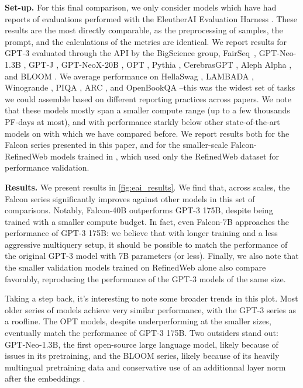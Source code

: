 \documentclass{article}
\begin{document}
\textbf{Set-up.} For this final comparison, we only consider models which have had reports of evaluations performed with the EleutherAI Evaluation Harness \citep{eval-harness}. These results are the most directly comparable, as the preprocessing of samples, the prompt, and the calculations of the metrics are identical. We report results for GPT-3 evaluated through the API by the BigScience group, FairSeq~\citep{artetxe2021efficient}, GPT-Neo-1.3B \citep{gpt-neo}, GPT-J \citep{gpt-j}, GPT-NeoX-20B \citep{black2022gpt}, OPT \citep{zhang2022opt}, Pythia \citep{biderman2023pythia}, CerebrasGPT \citep{dey2023cerebras}, Aleph Alpha \citep{alephalpha}, and BLOOM \citep{bloom}. We average performance on HellaSwag \citep{zellers2019hellaswag}, LAMBADA \citep{paperno2016lambada}, Winogrande \citep{sakaguchi2019winogrande}, PIQA \citep{bisk2020piqa}, ARC \citep{clark2018arc}, and OpenBookQA \citep{mihaylov2press2021train018openbookqa}--this was the widest set of tasks we could assemble based on different reporting practices across papers. We note that these models mostly span a smaller compute range (up to a few thousands PF-days at most), and with performance starkly below other state-of-the-art models on with which we have compared before. We report results both for the Falcon series presented in this paper, and for the smaller-scale Falcon-RefinedWeb models trained in \citet{refinedweb}, which used only the RefinedWeb dataset for performance validation.

\textbf{Results.} We present results in \cref{fig:eai_results}. We find that, across scales, the Falcon series significantly improves against other models in this set of comparisons. Notably, Falcon-40B outperforms GPT-3 175B, despite being trained with a smaller compute budget. In fact, even Falcon-7B approaches the performance of GPT-3 175B: we believe that with longer training and a less aggressive multiquery setup, it should be possible to match the performance of the original GPT-3 model with 7B parameters (or less). Finally, we also note that the smaller validation models trained on RefinedWeb alone also compare favorably, reproducing the performance of the GPT-3 models of the same size. 

Taking a step back, it's interesting to note some broader trends in this plot. Most older series of models achieve very similar performance, with the GPT-3 series as a roofline. The OPT models, despite underperforming at the smaller sizes, eventually match the performance of GPT-3 175B. Two outsiders stand out: GPT-Neo-1.3B, the first open-source large language model, likely because of issues in its pretraining, and the BLOOM series, likely because of its heavily multingual pretraining data and conservative use of an additionnal layer norm after the embeddings \citep{what_lang_model}.
\end{document}
